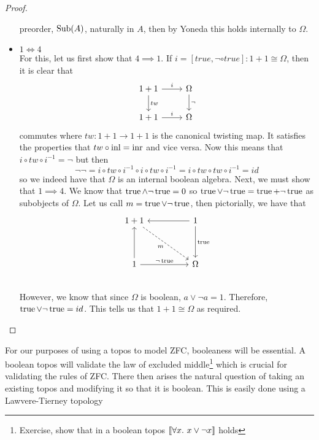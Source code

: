 \begin{proof}
\begin{itemize}
    preorder, $\operatorname{Sub}(A)$, naturally in $A$, then by Yoneda this holds
    internally to $\Omega$.
  \item $1 \iff 4$\\
    For this, let us first show that $4 \implies 1$. If
    $i = [true, \neg \circ true] : 1 + 1 \cong \Omega$, then it is clear
    that
    \[
      \begin{tikzcd}
        1 + 1 \ar[r, "i"] \ar[d, "tw"] & \Omega \ar[d, "\neg"] \\
        1 + 1 \ar[r, "i"] & \Omega
      \end{tikzcd}
    \]
    commutes where $tw : 1 + 1 \to 1 + 1$ is the canonical twisting
    map. It satisfies the properties that $tw \circ \operatorname{inl} = \operatorname{inr}$ and
    vice versa. Now this means that $i \circ tw \circ i^{-1} = \neg$
    but then
    \[
      \neg\neg = i \circ tw \circ i^{-1} \circ i \circ tw \circ i^{-1} =
      i \circ tw \circ tw \circ i^{-1} = id
    \]
    so we indeed have that $\Omega$ is an internal boolean
    algebra. Next, we must show that $1 \implies 4$. We know that
    $\operatorname{true} \wedge \neg \operatorname{true} = 0$ so
    $\operatorname{true} \vee \neg \operatorname{true} = \operatorname{true} + \neg \operatorname{true}$ as subobjects of
    $\Omega$. Let us call $m = \operatorname{true} \vee \neg \operatorname{true}$, then
    pictorially, we have that
    \[
      \begin{tikzcd}
        1 + 1 \ar[ddrr, dashed, swap, "m"] & &
        1 \ar[dd, "\true"] \ar[ll]\\
        &&\\
        1 \ar[rr, "\neg \true"] \ar[uu] & & \Omega\\
      \end{tikzcd}
    \]
    However, we know that since $\Omega$ is boolean,
    $a \vee \neg a = 1$. Therefore, $\operatorname{true} \vee \neg \operatorname{true} = id$. This
    tells us that $1 + 1 \cong \Omega$ as required.
  \end{itemize}
\end{proof}

For our purposes of using a topos to model ZFC, booleaness will be
essential. A boolean topos will validate the law of excluded
middle\footnote{Exercise, show that in a boolean topos
  $\llbracket \forall x.\ x \vee \neg x \rrbracket$ holds} which is crucial for
validating the rules of ZFC. There then arises the natural question of
taking an existing topos and modifying it so that it is boolean. This
is easily done using a Lawvere-Tierney topology

